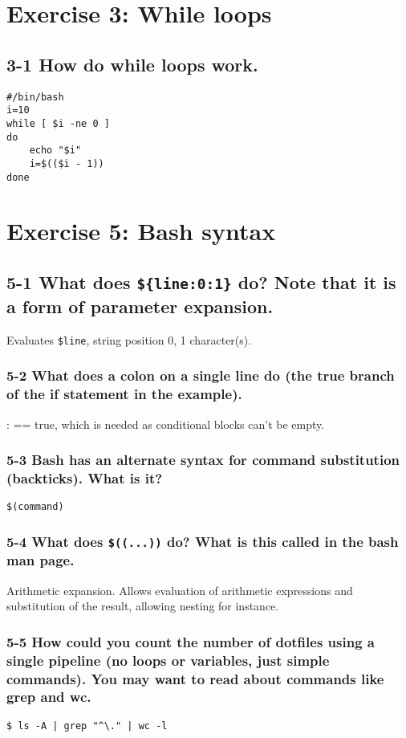 \section{Exercise 3: While loops}
\subsection{3-1 How do while loops work.}
\begin{verbatim}
#/bin/bash
i=10
while [ $i -ne 0 ]
do
    echo "$i"
    i=$(($i - 1))
done
\end{verbatim}

\section{Exercise 5: Bash syntax}
\subsection{5-1 What does \texttt{\$\{line:0:1\}} do? Note that it is a form of parameter expansion.}
Evaluates \verb=$line=, string position 0, 1 character(s).

\subsubsection{5-2 What does a colon on a single line do (the true branch of the if statement in the example).}
: == true, which is needed as conditional blocks can't be empty.

\subsubsection{5-3 Bash has an alternate syntax for command substitution (backticks). What is it?}
\verb=$(command)=

\subsubsection{5-4 What does \texttt{\$((...))} do? What is this called in the bash man page.}
Arithmetic expansion. Allows evaluation of arithmetic expressions and substitution of the result, allowing nesting for instance.

\subsubsection{5-5 How could you count the number of dotfiles using a single pipeline (no loops or variables, just simple commands). You may want to read about commands like grep and wc.}
\verb=$ ls -A | grep "^\." | wc -l=

